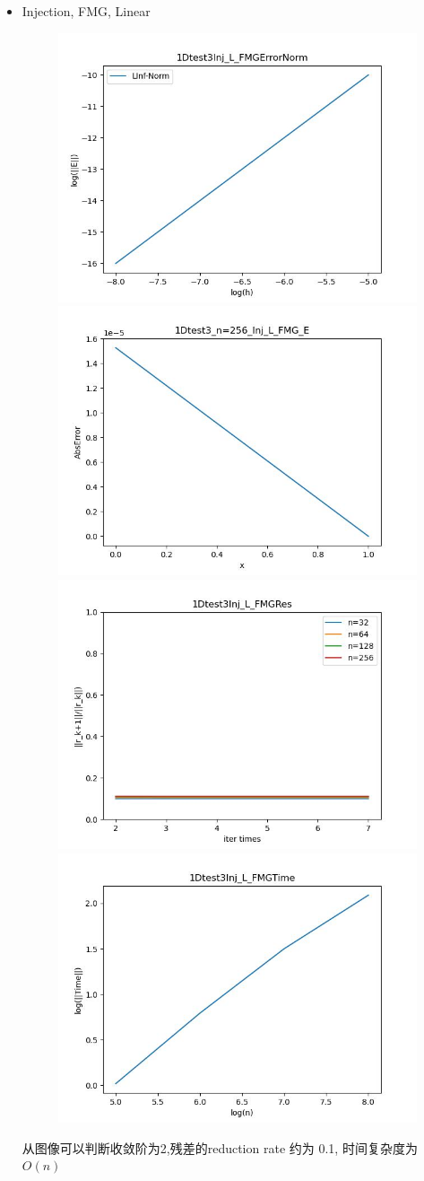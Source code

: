 \documentclass{article}
\begin{document}
\begin{itemize}
    \item Injection, FMG, Linear
    \begin{figure}[h]
        \centering
        \includegraphics[width=0.35\linewidth]{1Dtest3Inj_L_FMGErrorNorm.jpg}
        \includegraphics[width=0.35\linewidth]{1Dtest3_n=256_Inj_L_FMG_E.jpg}
        \includegraphics[width=0.35\linewidth]{1Dtest3Inj_L_FMGRes.jpg}
        \includegraphics[width=0.35\linewidth]{1Dtest3Inj_L_FMGTime.jpg}
    \end{figure}
    
    从图像可以判断收敛阶为2,残差的reduction rate 约为 0.1, 时间复杂度为$O(n)$
    \newpage


\end{itemize}
\end{document}
